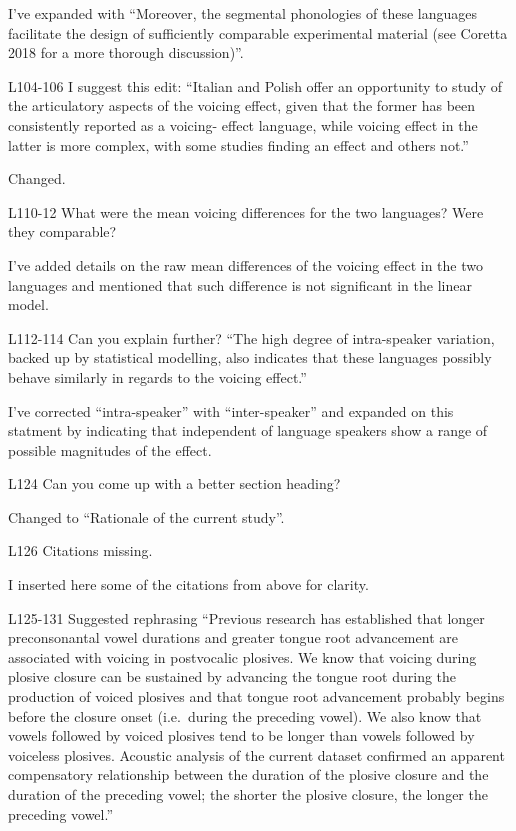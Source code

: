 \documentclass[]{article}
\begin{document}
\color{plum}

I've expanded with ``Moreover, the segmental phonologies of these
languages facilitate the design of sufficiently comparable experimental
material (see Coretta 2018 for a more thorough discussion)''.
\color{black}

L104-106 I suggest this edit: ``Italian and Polish offer an opportunity
to study of the articulatory aspects of the voicing effect, given that
the former has been consistently reported as a voicing- effect language,
while voicing effect in the latter is more complex, with some studies
finding an effect and others not.''

\color{plum}

Changed. \color{black}

L110-12 What were the mean voicing differences for the two languages?
Were they comparable?

\color{plum}

I've added details on the raw mean differences of the voicing effect in
the two languages and mentioned that such difference is not significant
in the linear model. \color{black}

L112-114 Can you explain further? ``The high degree of intra-speaker
variation, backed up by statistical modelling, also indicates that these
languages possibly behave similarly in regards to the voicing effect.''

\color{plum}

I've corrected ``intra-speaker'' with ``inter-speaker'' and expanded on
this statment by indicating that independent of language speakers show a
range of possible magnitudes of the effect. \color{black}

L124 Can you come up with a better section heading?

\color{plum}

Changed to ``Rationale of the current study''. \color{black}

L126 Citations missing.

\color{plum}

I inserted here some of the citations from above for clarity.
\color{black}

L125-131 Suggested rephrasing ``Previous research has established that
longer preconsonantal vowel durations and greater tongue root
advancement are associated with voicing in postvocalic plosives. We know
that voicing during plosive closure can be sustained by advancing the
tongue root during the production of voiced plosives and that tongue
root advancement probably begins before the closure onset (i.e.~during
the preceding vowel). We also know that vowels followed by voiced
plosives tend to be longer than vowels followed by voiceless plosives.
Acoustic analysis of the current dataset confirmed an apparent
compensatory relationship between the duration of the plosive closure
and the duration of the preceding vowel; the shorter the plosive
closure, the longer the preceding vowel.''
\end{document}
